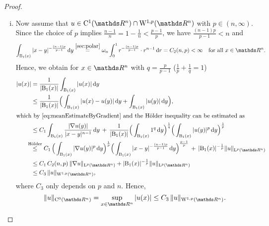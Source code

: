 \begin{proof}
\begin{enumerate}[i)]
    \item Now assume that $u \in \CC^1(\R^n) \cap \WW^{1,p}(\R^n)$ with $p \in (n,\infty)$.
      Since the choice of $p$ implies $\frac{n - 1}{n} = 1 - \frac{1}{n} < \frac{p -1}{p}$, we have $ \frac{(n - 1)p}{p - 1} < n $ and
      $$
      \int_{\BB_1(x)} |x - y|^{-\frac{(n - 1)p}{p - 1}} \d y
      \overset{\ref{sec:polar}}{=} \omega_n \int_0^1 r^{-\frac{(n - 1)p}{p - 1}} \cdot r^{n - 1}\d r = C_2(n,p) < \infty \quad\text{for all } x \in \R^n.
      $$
      Hence, we obtain for $x \in \R^n$ with $q = \frac{p}{p - 1}$ ($\frac{1}{p} + \frac{1}{q} = 1$)
      \begin{align*}
        |u(x)|
        &= \frac{1}{|\BB_1(x)|} \int_{\BB_1(x)} |u(x)|\d y  \\
        &\leq \frac{1}{|\BB_1(x)|} \Big( \int_{\BB_1(x)} |u(x) - u(y)| \d y + \int_{\BB_1(x)} |u(y)| \d y \Big),\\
        \intertext{which by \eqref{eq:meanEstimateByGradient} and the Hölder inequality can be estimated as}
        &\leq C_1 \int_{\BB_1(x)} \frac{|\nabla u(y)|}{|x - y|^{n - 1}} \d y \,+\, \frac{1}{|\BB_1(x)|} \Big( \int_{\BB_1(x)} 1^q \d y \Big)^{\frac{1}{q}} \Big( \int_{\BB_1(x)} |u(y)|^p \d y \Big)^{\frac{1}{p}} \\
        &\hspace{-0.8em}\overset{\text{Hölder}}{\leq} C_1 \, \Big( \int_{\BB_1(x)} |\nabla u(y)|^p \d y \Big)^{\frac{1}{p}} \Big( \int_{\BB_1(x)} |x - y|^{-\frac{(n -1)p}{p - 1}} \d y \Big)^{\frac{p - 1}{p}} \,+\, |\BB_1(x)|^{-\frac{1}{p}} \|u\|_{\Ell^p(\R^n)} \\
        &\leq C_1\, C_2(n,p) \, \|\nabla u\|_{\Ell^p(\R^n)} + |\BB_1(x)|^{-\frac{1}{p}} \|u\|_{\Ell^p(\R^n)} \\
        &\leq C_3 \, \|u\|_{\WW^{1,p}(\R^n)},
      \end{align*}
      where $C_3$ only depends on $p$ and $n$.
      Hence,
      \begin{equation}
        \label{eq:supEstimate}
        \|u\|_{\CC^0(\R^n)} = \sup_{x \in \R^n} |u(x)| \leq C_3\, \|u\|_{\WW^{1,p}(\R^n)}.
      \end{equation}


\end{enumerate}
\end{proof}
